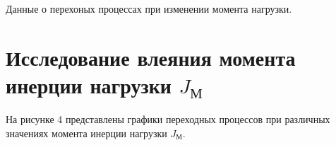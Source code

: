 \documentclass[a4paper, 11pt]{article}
\begin{document}
\begin{table}[h!]
    \caption{Данные о перехоных процессах при изменении момента нагрузки.}
    \centering
\end{table}

\section*{Исследование влеяния момента инерции нагрузки $J_\text{М}$}
На рисунке 4 представлены графики переходных процессов при различных значениях момента инерции нагрузки $J_\text{М}$.
\end{document}
